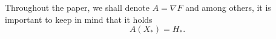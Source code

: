 Throughout the paper, we shall denote $A = \nabla F$ and among others, it is important to keep in mind that it holds
\begin{equation} 
A(X_*) = H_*. 
\end{equation}
%
